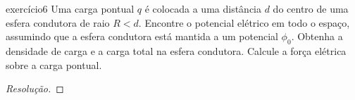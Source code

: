 \begin{exercício}{}{exercício6}
    Uma carga pontual \(q\) é colocada a uma distância \(d\) do centro de uma esfera condutora de raio \(R < d\). Encontre o potencial elétrico em todo o espaço, assumindo que a esfera condutora está mantida a um potencial \(\phi_0\). Obtenha a densidade de carga e a carga total na esfera condutora. Calcule a força elétrica sobre a carga pontual.
\end{exercício}
\begin{proof}[Resolução]

\end{proof}
